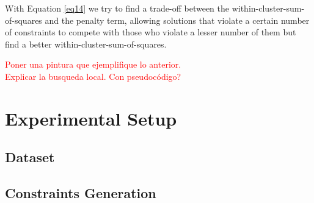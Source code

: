 \documentclass[review]{elsarticle}
\begin{document}
With Equation \eqref{eq14} we try to find a trade-off between the within-cluster-sum-of-squares and the penalty term, allowing solutions that violate a certain number of constraints to compete with those who violate a lesser number of them but find a better within-cluster-sum-of-squares.

\textcolor{red}{Poner una pintura que ejemplifique lo anterior.}\\
\textcolor{red}{Explicar la busqueda local. Con pseudocódigo?}

\clearpage

\section{Experimental Setup}

\subsection{Dataset}

\begin{table}[!h]
	\centering
	\setlength{\tabcolsep}{7pt}
	\renewcommand{\arraystretch}{0.9}
	\caption{Summary of datasets used for the experiments \textcolor{red}{citar keel}}
	\label{undefined}
\end{table}

\subsection{Constraints Generation}

\begin{table}[!h]
	\centering
	\setlength{\tabcolsep}{7pt}
	\renewcommand{\arraystretch}{0.9}
	
	\caption{Number of constraints used in experiments}
	\label{undefined}
\end{table}
\end{document}
